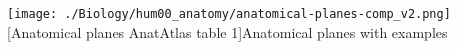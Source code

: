 %  
% 
% 
% 		
% 			
% 		

\enlargethispage{2cm}
         \vspace{-4pt}

	\begin{center}

	\begin{minipage}[htbp]{12cm}
 		{\texttt{[image: ./Biology/hum00\_anatomy/anatomical-planes-comp\_v2.png]}}
		[Anatomical planes AnatAtlas
		 table 1]{Anatomical planes with examples}  \label{fig:SchnittEbenen}
		\vspace{2pt}
	\end{minipage}
		
	\end{center}

